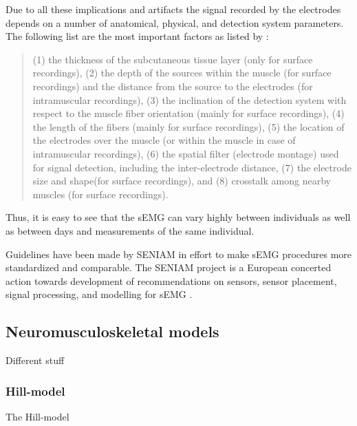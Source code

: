 Due to all these implications and artifacts the signal recorded by the electrodes depends on a number of anatomical, physical, and detection system parameters. The following list are the most important factors as listed by :
\begin{quote}
(1) the thickness of the subcutaneous tissue layer (only for surface recordings),
(2) the depth of the sources within the muscle (for surface recordings) and the distance from the source to the electrodes (for intramuscular recordings),
(3) the inclination of the detection system with respect to the muscle fiber orientation (mainly for surface recordings),
(4) the length of the fibers (mainly for surface recordings),
(5) the location of the electrodes over the muscle (or within the muscle in case of intramuscular recordings),
(6) the spatial filter (electrode montage) used for signal detection, including the inter-electrode distance,
(7) the electrode size and shape(for surface recordings), and
(8) crosstalk among nearby muscles (for surface recordings).
\end{quote}
Thus, it is easy to see that the \ac{sEMG} can vary highly between individuals as well as between days and measurements of the same individual.

Guidelines have been made by \ac{SENIAM} in effort to make \ac{sEMG} procedures more standardized and comparable. 
The \ac{SENIAM} project is a European concerted action towards development of recommendations on sensors, sensor placement, signal processing, and modelling for \ac{sEMG} \cite{Hermens2000}.

\subsection{Neuromusculoskeletal models}
\label{sec:A-NMSModels}
Different stuff

\subsubsection{Hill-model}
\label{sec:A-HillModel}
The Hill-model 

